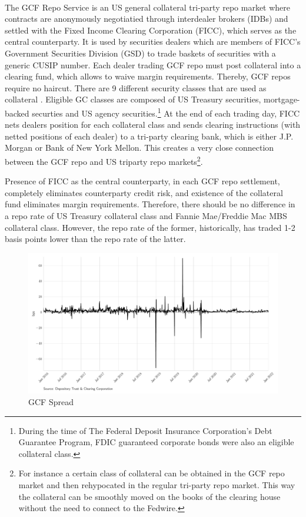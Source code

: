 \documentclass[11pt,a4paper,english,oneside]{article}
\begin{document}
The GCF Repo\textsuperscript{\tiny\textregistered} Service is an US general collateral tri-party repo market where contracts are anonymously negotiatied through interdealer brokers (IDBs) and settled with the Fixed Income Clearing Corporation (FICC), which serves as the central counterparty.  It is used by securities dealers which are members of FICC's Government Securities Division (GSD) to trade baskets of securities with a generic CUSIP number. Each dealer trading GCF repo must post collateral into a clearing fund, which allows to waive margin requirements. Thereby, GCF repos require no haircut. There are 9 different security classes that are used as collateral \citep{dtcc2012}. Eligible GC classes are composed of US Treasury securities, mortgage-backed securties and US agency securities.\footnote{During the time of The Federal Deposit Insurance Corporation’s Debt Guarantee Program, FDIC guaranteed corporate bonds were also an eligible collateral class.} At the end of each trading day, FICC nets dealers position for each collateral class and sends clearing instructions (with netted positions of each dealer) to a tri-party clearing bank, which is either J.P. Morgan or Bank of New York Mellon. This creates a very close connection between the GCF repo and US triparty repo markets\footnote{For instance a certain class of collateral can be obtained in the GCF repo market and then rehypocated in the regular tri-party repo market. This way the collateral can be smoothly moved on the books of the clearing house without the need to connect to the Fedwire.}.

Presence of FICC as the central counterparty, in each GCF repo settlement, completely eliminates counterparty credit risk, and existence of the collateral fund eliminates margin requirements. Therefore, there should be no difference in a repo rate of US Treasury collateral class and Fannie Mae/Freddie Mac MBS collateral class. However, the repo rate of the former, historically, has traded 1-2 basis points lower than the repo rate of the latter. 

\begin{figure}[htb!]
  \begin{center}
    \caption{GCF Spread}
    \label{fig:rates}
    \includegraphics[width=0.99\linewidth]{gcf_spread.pdf}
  \end{center}
\end{figure}
\end{document}
